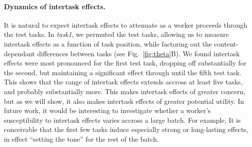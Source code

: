 \documentclass[12pt]{article}
\begin{document}
\paragraph{Dynamics of intertask effects.} It is natural to expect 
intertask effects to attenuate as a worker proceeds through the test tasks.  
In \textit{task1}, we permuted the test tasks, allowing us to 
measure intertask effects as a function of task position, while factoring
out the content-dependant differences between tasks
(see Fig.~\ref{fig:theta}B). 
We found intertask effects were most pronounced for the first test task,
dropping off substantially for the second, but maintaining a 
significant effect through until the fifth test task.  
This shows that the range of intertask effects extends accross at least five 
tasks, and probably substantially more.
This makes intertask effects of greater concern, but as we will show, it also
makes intertask effects of greater potential utility.
In future work, it would be interesting to investigate whether a worker's
susceptibility to intertask effects varies accross a large batch.  For example,
It is conceivable that the first few tasks induce especially strong
or long-lasting effects, in effect ``setting the tone'' for the rest of the batch.
\end{document}

